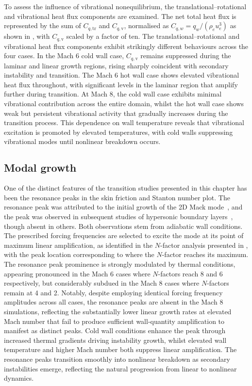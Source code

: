 To assess the influence of vibrational nonequilibrium, the translational--rotational and vibrational heat flux components are examined. The net total heat flux is represented by the sum of $C_{q,\mathrm{tr}}$ and $C_{q,\mathrm{v}}$, normalised as $C_{q,w} = q_w / (\rho_e u_e^3)$ as shown in , with $C_{q,\mathrm{v}}$ scaled by a factor of ten. The translational--rotational and vibrational heat flux components exhibit strikingly different behaviours across the four cases. In the Mach 6 cold wall case, $C_{q,\mathrm{v}}$ remains suppressed during the laminar and linear growth regions, rising sharply coincident with secondary instability and transition. The Mach 6 hot wall case shows elevated vibrational heat flux throughout, with significant levels in the laminar region that amplify further during transition. At Mach 8, the cold wall case exhibits minimal vibrational contribution across the entire domain, whilst the hot wall case shows weak but persistent vibrational activity that gradually increases during the transition process. This dependence on wall temperature reveals that vibrational excitation is promoted by elevated temperatures, with cold walls suppressing vibrational modes until nonlinear breakdown occurs.





\subsection{Modal growth}

One of the distinct features of the transition studies presented in this chapter has been the resonance peaks in the skin friction and Stanton number plot. The resonance peak was attributed to the initial growth of the 2D Mack mode~\citep{Franko2013}, and the peak was observed in subsequent studies of hypersonic boundary layers~\citep{DiRenzo2021}, though absent in others. Both observations stem from adiabatic wall conditions. The prescribed forcing frequencies are selected to excite the mode at its point of maximum linear amplification, as identified in the $N$-factor analysis presented in , with the peak location corresponding to where the $N$-factor reaches its maximum. The resonance peak prominence is strongly modulated by thermal conditions, appearing pronounced in the Mach 6 cases where $N$-factors reach 8 and 6 respectively, but considerably subdued in the Mach 8 cases where $N$-factors remain at 4 and 2. Notably, despite employing identical forcing frequency amplitudes across all cases, the resonance peaks are absent in the Mach 8 simulations, reflecting the substantially lower linear growth rates at elevated Mach number that fail to produce sufficient wall-quantity amplification to manifest as distinct peaks. Cold wall conditions enhance the peak through increased thermal gradients driving instability growth, whilst elevated wall temperature and higher Mach number both suppress linear amplification. The resonance peaks transition smoothly into nonlinear breakdown as secondary instabilities emerge, reflecting the natural progression from linear to nonlinear dynamics.


